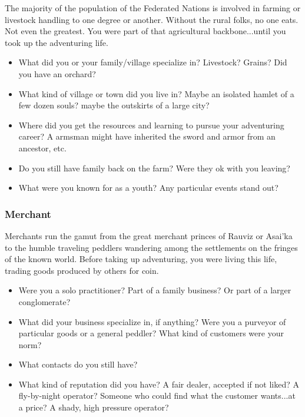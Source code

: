 The majority of the population of the Federated Nations is involved in farming or livestock handling to one degree or another. Without the rural folks, no one eats. Not even the greatest. You were part of that agricultural backbone...until you took up the adventuring life.

\begin{itemize}
	\item What did you or your family/village specialize in? Livestock? Grains? Did you have an orchard?
	\item What kind of village or town did you live in? Maybe an isolated hamlet of a few dozen souls? maybe the outskirts of a large city?
	\item Where did you get the resources and learning to pursue your adventuring career? A armsman might have inherited the sword and armor from an ancestor, etc.
	\item Do you still have family back on the farm? Were they ok with you leaving?
	\item What were you known for as a youth? Any particular events stand out?
\end{itemize}

\subsubsection{Merchant}

Merchants run the gamut from the great merchant princes of Rauviz or Asai'ka to the humble traveling peddlers wandering among the settlements on the fringes of the known world. Before taking up adventuring, you were living this life, trading goods produced by others for coin.

\begin{itemize}
	\item Were you a solo practitioner? Part of a family business? Or part of a larger conglomerate?
	\item What did your business specialize in, if anything? Were you a purveyor of particular goods or a general peddler? What kind of customers were your norm?
	\item What contacts do you still have?
	\item What kind of reputation did you have? A fair dealer, accepted if not liked? A fly-by-night operator? Someone who could find what the customer wants...at a price? A shady, high pressure operator?
\end{itemize}

